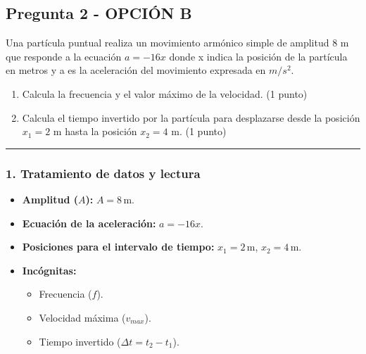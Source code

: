 \newpage

\subsection{Pregunta 2 - OPCIÓN B}
\label{subsec:2B_2006_sep}

\begin{cajaenunciado}
Una partícula puntual realiza un movimiento armónico simple de amplitud 8 m que responde a la ecuación $a=-16x$ donde x indica la posición de la partícula en metros y a es la aceleración del movimiento expresada en $m/s^{2}$. 
\begin{enumerate}
    \item Calcula la frecuencia y el valor máximo de la velocidad. (1 punto) 
    \item Calcula el tiempo invertido por la partícula para desplazarse desde la posición $x_{1}=2$ m hasta la posición $x_{2}=4$ m. (1 punto) 
\end{enumerate}
\end{cajaenunciado}
\hrule

\subsubsection*{1. Tratamiento de datos y lectura}
\begin{itemize}
    \item \textbf{Amplitud ($A$):} $A = 8 \, \text{m}$.
    \item \textbf{Ecuación de la aceleración:} $a = -16x$.
    \item \textbf{Posiciones para el intervalo de tiempo:} $x_1 = 2 \, \text{m}$, $x_2 = 4 \, \text{m}$.
    \item \textbf{Incógnitas:}
        \begin{itemize}
            \item Frecuencia ($f$).
            \item Velocidad máxima ($v_{max}$).
            \item Tiempo invertido ($\Delta t = t_2 - t_1$).
        \end{itemize}
\end{itemize}

